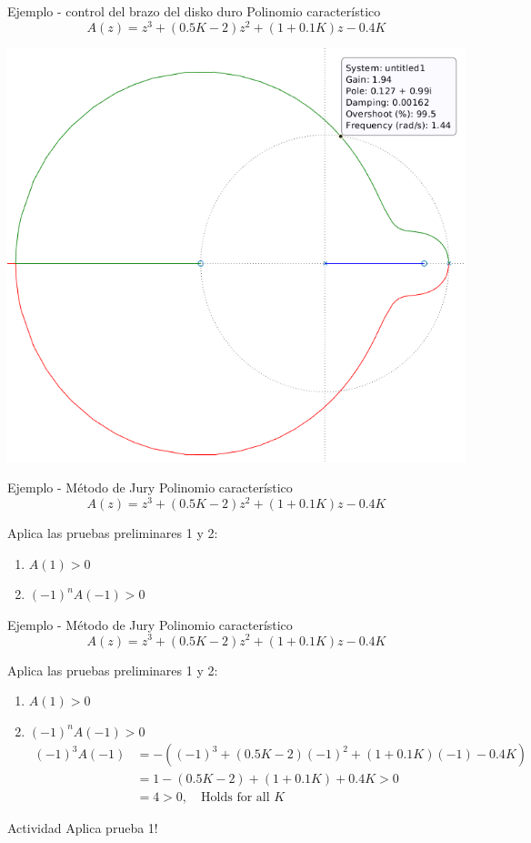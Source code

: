 \documentclass[presentation,aspectratio=169]{beamer}
\begin{document}
\begin{frame}[label={sec:org35d3afe}]{Ejemplo - control del brazo del disko duro}
Polinomio característico \[ A(z) = z^3 + (0.5K-2)z^2 + (1+0.1K)z - 0.4K\]
\begin{center}
\includegraphics[width=0.5\linewidth]{../../figures/diskdrive-lead-discrete-rlocus.png}
\end{center}
\end{frame}

\begin{frame}[label={sec:org83da073}]{Ejemplo - Método de Jury}
Polinomio característico \[ A(z) = z^3 + (0.5K-2)z^2 + (1+0.1K)z - 0.4K\]

Aplica las pruebas preliminares 1 y 2:
\begin{enumerate}
\item \(A(1) > 0\)
\item \((-1)^nA(-1) > 0\)
\end{enumerate}
\end{frame}

\begin{frame}[label={sec:orgb9951a1}]{Ejemplo - Método de Jury}
Polinomio característico \[ A(z) = z^3 + (0.5K-2)z^2 + (1+0.1K)z - 0.4K\]

Aplica las pruebas preliminares 1 y 2:
\begin{enumerate}
\item \(A(1) > 0\)
\item \((-1)^nA(-1) > 0\)
\begin{align}
(-1)^3A(-1) &= -\left((-1)^3 + (0.5K-2)(-1)^2 + (1+0.1K)(-1) - 0.4K \right)\\
 &= 1-(0.5K-2) +(1+0.1K) + 0.4K > 0\\
 &=4 >0, \quad \text{Holds for all \(K\)}
 \end{align}
\end{enumerate}


\alert{Actividad} Aplica prueba 1!
\end{frame}
\end{document}
